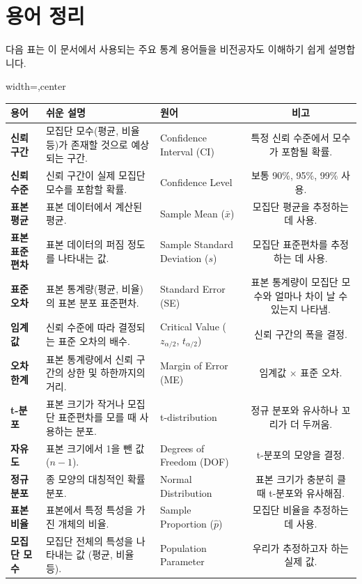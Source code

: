 \documentclass[11pt,a4paper]{article}
\begin{document}
\newpage
\section*{용어 정리}
다음 표는 이 문서에서 사용되는 주요 통계 용어들을 비전공자도 이해하기 쉽게 설명합니다.

\begin{adjustbox}{width=\textwidth,center}
\begin{tabular}{lllc}
\toprule
\textbf{용어} & \textbf{쉬운 설명} & \textbf{원어} & \textbf{비고} \\
\midrule
\textbf{신뢰 구간} & 모집단 모수(평균, 비율 등)가 존재할 것으로 예상되는 구간. & Confidence Interval (CI) & 특정 신뢰 수준에서 모수가 포함될 확률. \\
\textbf{신뢰 수준} & 신뢰 구간이 실제 모집단 모수를 포함할 확률. & Confidence Level & 보통 90\%, 95\%, 99\% 사용. \\
\textbf{표본 평균} & 표본 데이터에서 계산된 평균. & Sample Mean ($\bar{x}$) & 모집단 평균을 추정하는 데 사용. \\
\textbf{표본 표준편차} & 표본 데이터의 퍼짐 정도를 나타내는 값. & Sample Standard Deviation ($s$) & 모집단 표준편차를 추정하는 데 사용. \\
\textbf{표준 오차} & 표본 통계량(평균, 비율)의 표본 분포 표준편차. & Standard Error (SE) & 표본 통계량이 모집단 모수와 얼마나 차이 날 수 있는지 나타냄. \\
\textbf{임계값} & 신뢰 수준에 따라 결정되는 표준 오차의 배수. & Critical Value ($z_{\alpha/2}$, $t_{\alpha/2}$) & 신뢰 구간의 폭을 결정. \\
\textbf{오차 한계} & 표본 통계량에서 신뢰 구간의 상한 및 하한까지의 거리. & Margin of Error (ME) & 임계값 $\times$ 표준 오차. \\
\textbf{t-분포} & 표본 크기가 작거나 모집단 표준편차를 모를 때 사용하는 분포. & t-distribution & 정규 분포와 유사하나 꼬리가 더 두꺼움. \\
\textbf{자유도} & 표본 크기에서 1을 뺀 값 ($n-1$). & Degrees of Freedom (DOF) & t-분포의 모양을 결정. \\
\textbf{정규 분포} & 종 모양의 대칭적인 확률 분포. & Normal Distribution & 표본 크기가 충분히 클 때 t-분포와 유사해짐. \\
\textbf{표본 비율} & 표본에서 특정 특성을 가진 개체의 비율. & Sample Proportion ($\hat{p}$) & 모집단 비율을 추정하는 데 사용. \\
\textbf{모집단 모수} & 모집단 전체의 특성을 나타내는 값 (평균, 비율 등). & Population Parameter & 우리가 추정하고자 하는 실제 값. \\
\bottomrule
\end{tabular}
\end{adjustbox}
\end{document}
